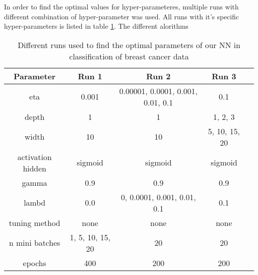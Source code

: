
In order to find the optimal values for hyper-parameteres, multiple runs with
different combination of hyper-parameter was used. All runs with it's specific
hyper-parameters is listed in table \ref{tab:runs_classification_cancer}. The different alorithms %



\begin{table}[H]
    \centering
    \caption{Different runs used to find the optimal parameters of our NN in
    classification of breast cancer data}  
    \label{tab:runs_classification_cancer} 
    \begin{tabular}{|c|c|c|c|c|}
        \hline

        Parameter & Run 1 & Run 2 & Run 3 \\
        \hline
        eta & 0.001 & 0.00001, 0.0001, 0.001, 0.01, 0.1 & 0.1 \\
        \hline
        depth & 1  & 1  & 1, 2, 3 \\
        \hline
        width & 10   & 10 & 5, 10, 15, 20\\
        \hline
        activation hidden & sigmoid & sigmoid & sigmoid\\
        \hline
        gamma & 0.9 & 0.9 & 0.9\\
        \hline
        lambd & 0.0  & 0, 0.0001, 0.001, 0.01, 0.1 & 0.1\\
        \hline
        tuning method & none & none  & none\\
        \hline
        n mini batches & 1, 5, 10, 15, 20  & 20 & 20\\
        \hline
        epochs & 400  & 200 & 200\\
        \hline
         
    \end{tabular} 
\end{table}

